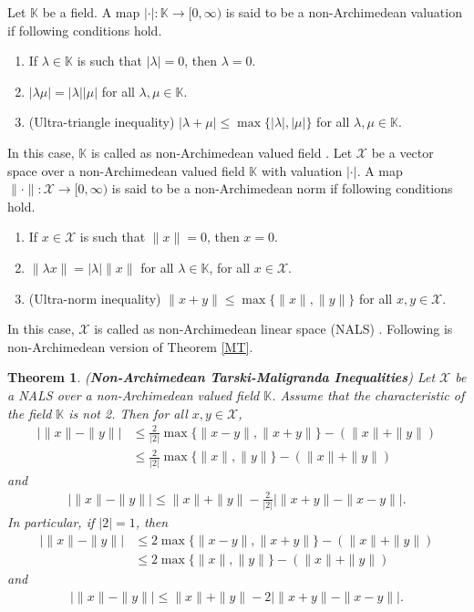 \documentclass{amsart}
\newtheorem{theorem}{Theorem}[section]
\begin{document}
Let $\mathbb{K}$ be a field. A map $|\cdot|: \mathbb{K} \to [0, \infty)$ is said to be a non-Archimedean  valuation  if following conditions hold.
\begin{enumerate}[\upshape(i)]
	\item If $\lambda  \in \mathbb{K}$ is such that $|\lambda|=0$, then $\lambda=0$.
	\item $|\lambda \mu|=|\lambda||\mu|$ for all $\lambda, \mu  \in \mathbb{K}$.
	\item (Ultra-triangle inequality) $|\lambda+\mu|\leq \max\{|\lambda|, |\mu|\}$ for all $\lambda, \mu \in \mathbb{K}$.
\end{enumerate}
In this case, $\mathbb{K}$ is called as non-Archimedean valued field \cite{SCHIKHOF}.  Let $\mathcal{X}$ be a vector space over a non-Archimedean valued field $\mathbb{K}$ with valuation $|\cdot|$. A map $\|\cdot\|: \mathcal{X} \to [0, \infty)$ is said to be a non-Archimedean norm if following conditions hold.
\begin{enumerate}[\upshape(i)]
	\item If $x \in \mathcal{X}$ is such that $\|x\|=0$, then $x=0$.
	\item $\|\lambda x\|=|\lambda|\|x\|$ for all $\lambda \in \mathbb{K}$, for all $x \in \mathcal{X}$.
	\item (Ultra-norm inequality) $\|x+y\|\leq \max\{\|x\|, \|y\|\}$ for all $x,y \in \mathcal{X}$.
\end{enumerate}
In this case, $\mathcal{X}$ is called as non-Archimedean linear space (NALS) \cite{GARCIASCHIKHOF}.   Following is non-Archimedean version of Theorem \ref{MT}.
\begin{theorem}\label{NTM}
(\textbf{Non-Archimedean Tarski-Maligranda Inequalities})
Let $\mathcal{X}$ be a NALS over a non-Archimedean valued field $\mathbb{K}$. Assume that the characteristic of the field $\mathbb{K}$ is not 2. Then for all $x, y \in \mathcal{X}$, 
\begin{align*}
	\bigg|\|x\|-\|y\|\bigg|&\leq \frac{2}{|2|}\max\{\|x-y\|, \|x+y\|\}-(\|x\|+\|y\|)\\
	&\leq \frac{2}{|2|}\max\{\|x\|, \|y\|\}-(\|x\|+\|y\|)
\end{align*}
and 
\begin{align*}
	\bigg|\|x\|-\|y\|\bigg|\leq \|x\|+\|y\|-\frac{2}{|2|}\bigg|\|x+y\|-\|x-y\|\bigg|.
\end{align*}	
In particular, if $|2|=1$, then 
\begin{align*}
\bigg|\|x\|-\|y\|\bigg|&\leq 2\max\{\|x-y\|, \|x+y\|\}-(\|x\|+\|y\|)\\
&\leq 2\max\{\|x\|, \|y\|\}-(\|x\|+\|y\|)
\end{align*}
and 
\begin{align*}
\bigg|\|x\|-\|y\|\bigg|\leq \|x\|+\|y\|-2\bigg|\|x+y\|-\|x-y\|\bigg|.
\end{align*}	
\end{theorem}
\end{document}
